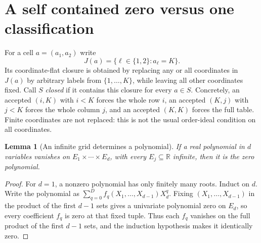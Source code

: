 \documentclass[11pt]{article}
\newtheorem{lemma}[theorem]{Lemma}
\theoremstyle{definition}
\theoremstyle{remark}
\begin{document}
\section{A self contained zero versus one classification}\label{cta:sec:closure}

For a cell $a=(a_1,a_2)$ write
\[
 J(a)=\{\ell\in\{1,2\}:a_\ell=K\}.
\]
Its coordinate-flat closure is obtained by replacing any or all coordinates
in $J(a)$ by arbitrary labels from $\{1,\ldots,K\}$, while leaving all
other coordinates fixed. Call $S$ \emph{closed} if it contains this closure
for every $a\in S$. Concretely, an accepted $(i,K)$ with $i<K$ forces the
whole row $i$, an accepted $(K,j)$ with $j<K$ forces the whole column $j$,
and an accepted $(K,K)$ forces the full table. Finite coordinates are
not replaced: this is not the usual order-ideal condition on all coordinates.

\begin{lemma}[An infinite grid determines a polynomial]\label{cta:lem:grid}
If a real polynomial in $d$ variables vanishes on
$E_1\times\cdots\times E_d$, with every $E_j\subseteq\mathbb R$ infinite,
then it is the zero polynomial.
\end{lemma}
\begin{proof}
For $d=1$, a nonzero polynomial has only finitely many roots. Induct on $d$.
Write the polynomial as $\sum_{q=0}^D f_q(X_1,\ldots,X_{d-1})X_d^q$.
Fixing $(X_1,\ldots,X_{d-1})$ in the product of the first $d-1$ sets gives
a univariate polynomial zero on $E_d$, so every coefficient $f_q$ is zero
at that fixed tuple. Thus each $f_q$ vanishes on the full product of the
first $d-1$ sets, and the induction hypothesis makes it identically zero.
\end{proof}
\end{document}
